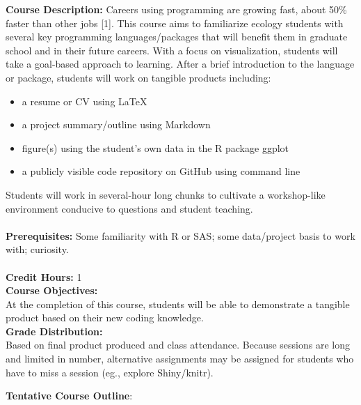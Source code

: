 \documentclass[11pt]{article}
\begin{document}
\textbf {\large Course Description:} Careers using programming are growing fast, about 50\% faster than other jobs [1]. This course aims to familiarize ecology students with several key programming languages/packages that will benefit them in graduate school and in their future careers. With a focus on visualization, students will take a goal-based approach to learning. After a brief introduction to the language or package, students will work on tangible products including:
\begin{itemize}
\item a resume or CV using \LaTeX
\item a project summary/outline using Markdown
\item figure(s) using the student's own data in the R package ggplot
\item a publicly visible code repository on GitHub using command line
\end{itemize}
Students will work in several-hour long chunks to cultivate a workshop-like environment conducive to questions and student teaching.\\\\
\textbf {\large Prerequisites:} Some familiarity with R or SAS; some data/project basis to work with; curiosity.\\\\
\textbf {\large Credit Hours:} 1 \\

\textbf {\large Course Objectives:} \\
At the completion of this course, students will be able to demonstrate a tangible product based on their new coding knowledge.\\

\textbf {\large Grade Distribution:} \\
Based on final product produced and class attendance. Because sessions are long and limited in number, alternative assignments may be assigned for students who have to miss a session (eg., explore Shiny/knitr).

\newpage

\textbf {\large Tentative Course Outline}:
\end{document}
